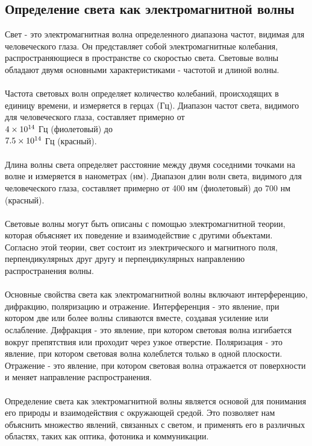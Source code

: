 \documentclass{article}
\begin{document}
\subsection{Определение света как электромагнитной волны}
Свет - это электромагнитная волна определенного диапазона частот, видимая для человеческого глаза. Он представляет собой электромагнитные колебания, распространяющиеся в пространстве со скоростью света. Световые волны обладают двумя основными характеристиками - частотой и длиной волны.\\
~\\
Частота световых волн определяет количество колебаний, происходящих в единицу времени, и измеряется в герцах (Гц). Диапазон частот света, видимого для человеческого глаза, составляет примерно от \\$4 \times 10^{14}\\$ Гц (фиолетовый) до \\$7.5 \times 10^{14}\\$ Гц (красный).\\
~\\
Длина волны света определяет расстояние между двумя соседними точками на волне и измеряется в нанометрах (нм). Диапазон длин волн света, видимого для человеческого глаза, составляет примерно от 400 нм (фиолетовый) до 700 нм (красный).\\
~\\
Световые волны могут быть описаны с помощью электромагнитной теории, которая объясняет их поведение и взаимодействие с другими объектами. Согласно этой теории, свет состоит из электрического и магнитного поля, перпендикулярных друг другу и перпендикулярных направлению распространения волны.\\
~\\
Основные свойства света как электромагнитной волны включают интерференцию, дифракцию, поляризацию и отражение. Интерференция - это явление, при котором две или более волны сливаются вместе, создавая усиление или ослабление. Дифракция - это явление, при котором световая волна изгибается вокруг препятствия или проходит через узкое отверстие. Поляризация - это явление, при котором световая волна колеблется только в одной плоскости. Отражение - это явление, при котором световая волна отражается от поверхности и меняет направление распространения.\\
~\\
Определение света как электромагнитной волны является основой для понимания его природы и взаимодействия с окружающей средой. Это позволяет нам объяснить множество явлений, связанных с светом, и применять его в различных областях, таких как оптика, фотоника и коммуникации.
\end{document}

